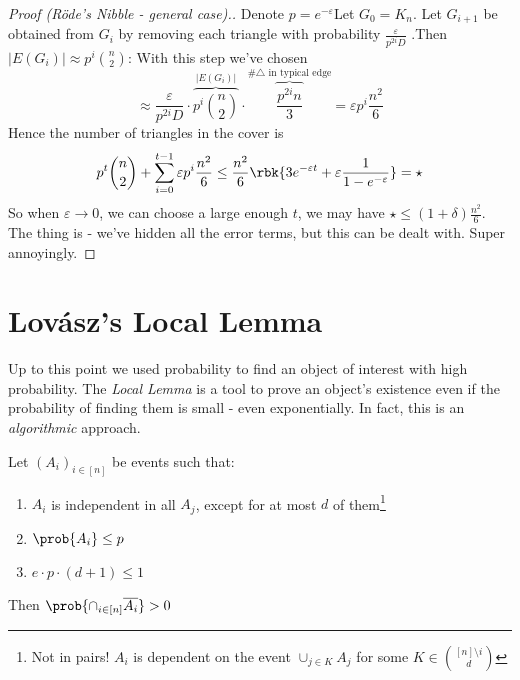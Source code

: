\documentclass[a4paper, 11pt, oneside]{book}
\begin{document}
\begin{proof}
	[Proof (R\"ode's Nibble - general case).] Denote $p = e^{-\varepsilon}$Let $G_0 = K_n$. Let $G_{i+1}$ be obtained from $G_i$ by removing each triangle with probability $\frac{\varepsilon}{p^{2i}D}$ .Then $|E(G_i)| \approx p^i{n\choose 2}$: With this step we've chosen $$\approx \frac{\varepsilon}{p^{2i}D}\cdot \overbrace{p^i{n\choose 2}}^{|E(G_i)|}\cdot  \overbrace{\frac{p^{2i}n}{3}}^{\text{\# $\triangle$ in typical edge}} = \varepsilon p^i\frac{n^2}{6}$$
	Hence the number of triangles in the cover is
	\[
	p^t{n\choose 2} + \sum_{i=0}^{t-1}\varepsilon p^i\frac{n^2}{6} \le \frac{n^2}{6}\rbk{3e^{-\varepsilon t} + \varepsilon\frac{1}{1-e^{-\varepsilon}}} = \star
	\]
	So when $\varepsilon\to 0$, we can choose a large enough $t$, we may have $\star \le (1+\delta)\frac{n^2}{6}$. The thing is - we've hidden all the error terms, but this can be dealt with. Super annoyingly.
\end{proof}

\chapter{Lov\'asz's Local Lemma}
Up to this point we used probability to find an object of interest with high probability.  The \emph{Local Lemma} is a tool to prove an object's existence even if the probability of finding them is small - even exponentially. In fact, this is an \emph{algorithmic} approach.
\begin{yellowBox}
\begin{thm}
	\label{Local Lemma} Let $(A_i)_{i\in [n]}$ be events such that:
	\begin{enumerate}
  \item  $A_i$ is independent in all $A_j$, except for at most $d$ of them\footnote{Not in pairs! $A_i$ is dependent on the event $\cup_{j\in K} A_j$ for some $K\in {[n]\setminus i\choose d}$}
	\item $\prob{A_i} \le p$
	\item $e\cdot p\cdot (d+1)\le 1$
\end{enumerate}
Then $\prob{\cap_{i\in [n]}\overline{A_i}} > 0$
\end{thm}	
\end{yellowBox}
\end{document}
